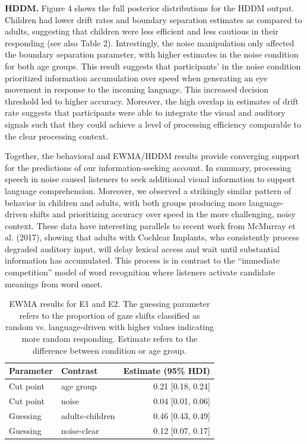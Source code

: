 \documentclass[10pt, letterpaper]{article}
\begin{document}
\textbf{HDDM.} Figure 4 shows the full posterior distributions for the
HDDM output. Children had lower drift rates and boundary separation
estimates as compared to adults, suggesting that children were less
efficient and less cautious in their responding (see also Table 2).
Intrestingly, the noise manipulation only affected the boundary
separation parameter, with higher estimates in the noise condition for
both age groups. This result suggests that participants' in the noise
condition prioritized information accumulation over speed when
generating an eye movement in response to the incoming language. This
increased decision threshold led to higher accuracy. Moreover, the high
overlap in estimates of drift rate suggests that participants were able
to integrate the visual and auditory signals such that they could
achieve a level of processing efficiency comparable to the clear
processing context.

Together, the behavioral and EWMA/HDDM results provide converging
support for the predictions of our information-seeking account. In
summary, processing speech in noise caused listeners to seek additional
visual information to support language comprehension. Moreover, we
observed a strikingly similar pattern of behavior in children and
adults, with both groups producing more language-driven shifts and
prioritizing accuracy over speed in the more challenging, noisy context.
These data have interesting parallels to recent work from McMurray et
al. (2017), showing that adults with Cochlear Implants, who consistently
process degraded auditory input, will delay lexical access and wait
until substantial information has accumulated. This process is in
contrast to the ``immediate competition'' model of word recognition
where listeners activate candidate meanings from word onset.

\begin{table}[t]
\centering
\begin{tabular}{llr}
  \hline
Parameter & Contrast & Estimate (95\% HDI) \\ 
  \hline
Cut point & age group & 0.21 [0.18, 0.24] \\ 
  Cut point & noise & 0.04 [0.01, 0.06] \\ 
  Guessing & adults-children & 0.46 [0.43, 0.49] \\ 
  Guessing & noise-clear & 0.12 [0.07, 0.17] \\ 
   \hline
\end{tabular}
\caption{EWMA results for E1 and E2. The guessing parameter refers to the proportion of gaze shifts classified as random vs. language-driven with higher values indicating more random responding. Estimate refers to the difference between condition or age group.} 
\end{table}
\end{document}

